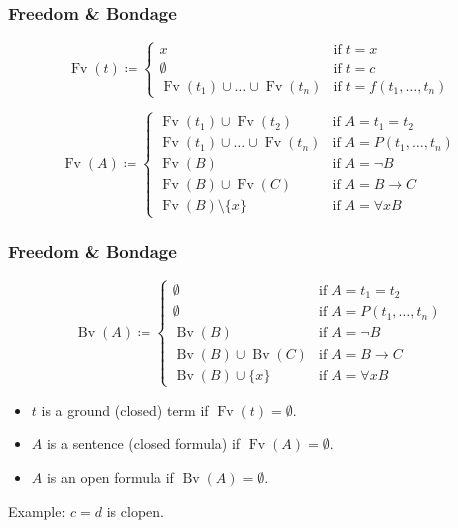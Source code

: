\documentclass[UTF8,aspectratio=43,11pt,colorlinks,compress,openany]{beamer}%
\begin{document}
\begin{frame}\frametitle{Freedom \& Bondage}
	\begin{definition}
		\[
		\operatorname{Fv}(t)\coloneqq 
		\begin{cases}
		x &\text{if}\;t=x\\
		\emptyset &\text{if}\;t=c\\
		\operatorname{Fv}(t_1)\cup\dots\cup \operatorname{Fv}(t_n) &\text{if}\;t=f(t_1,\dots,t_n)
		\end{cases}
		\]
	\end{definition}
	\begin{definition}
		\[
		\operatorname{Fv}(A)\coloneqq 
		\begin{cases}
		\operatorname{Fv}(t_1)\cup \operatorname{Fv}(t_2) &\text{if}\; A=t_1=t_2\\
		\operatorname{Fv}(t_1)\cup\dots\cup \operatorname{Fv}(t_n) &\text{if}\; A=P(t_1,\dots,t_n)\\
		\operatorname{Fv}(B) &\text{if}\; A=\neg B\\
		\operatorname{Fv}(B)\cup \operatorname{Fv}(C) &\text{if}\; A=B\to C\\
		\operatorname{Fv}(B)\setminus\{x\} &\text{if}\; A=\forall x B
		\end{cases}
		\]
	\end{definition}
\end{frame}

\begin{frame}\frametitle{Freedom \& Bondage}
	\begin{definition}
		\[\operatorname{Bv}(A)\coloneqq 
		\begin{cases}
		\emptyset &\text{if}\; A=t_1=t_2\\
		\emptyset &\text{if}\; A=P(t_1,\dots,t_n)\\
		\operatorname{Bv}(B) &\text{if}\; A=\neg B\\
		\operatorname{Bv}(B)\cup \operatorname{Bv}(C) &\text{if}\; A=B\to C\\
		\operatorname{Bv}(B)\cup\{x\} &\text{if}\; A=\forall x B
		\end{cases}\]
	\end{definition}
\begin{itemize}
	\item $t$ is a ground (closed) term if $\operatorname{Fv}(t)=\emptyset$.
	\item $A$ is a sentence (closed formula) if $\operatorname{Fv}(A)=\emptyset$.
	\item $A$ is an open formula if $\operatorname{Bv}(A)=\emptyset$.
\end{itemize}
	Example: $c=d$ is clopen.
\end{frame}
\end{document}
